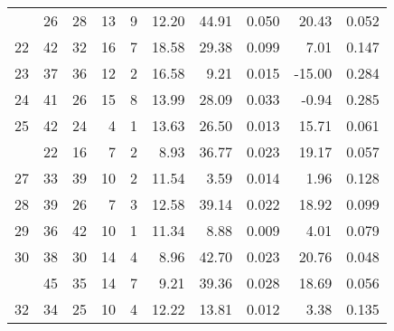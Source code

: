 \begin{tabular}[t]{rrrrrrrrrr}
\addlinespace
21 & 26 & 28 & 13 & 9 & 12.20 & 44.91 & 0.050 & 20.43 & 0.052\\
22 & 42 & 32 & 16 & 7 & 18.58 & 29.38 & 0.099 & 7.01 & 0.147\\
23 & 37 & 36 & 12 & 2 & 16.58 & 9.21 & 0.015 & -15.00 & 0.284\\
24 & 41 & 26 & 15 & 8 & 13.99 & 28.09 & 0.033 & -0.94 & 0.285\\
25 & 42 & 24 & 4 & 1 & 13.63 & 26.50 & 0.013 & 15.71 & 0.061\\
\addlinespace
26 & 22 & 16 & 7 & 2 & 8.93 & 36.77 & 0.023 & 19.17 & 0.057\\
27 & 33 & 39 & 10 & 2 & 11.54 & 3.59 & 0.014 & 1.96 & 0.128\\
28 & 39 & 26 & 7 & 3 & 12.58 & 39.14 & 0.022 & 18.92 & 0.099\\
29 & 36 & 42 & 10 & 1 & 11.34 & 8.88 & 0.009 & 4.01 & 0.079\\
30 & 38 & 30 & 14 & 4 & 8.96 & 42.70 & 0.023 & 20.76 & 0.048\\
\addlinespace
31 & 45 & 35 & 14 & 7 & 9.21 & 39.36 & 0.028 & 18.69 & 0.056\\
32 & 34 & 25 & 10 & 4 & 12.22 & 13.81 & 0.012 & 3.38 & 0.135\\
\bottomrule
\end{tabular}
